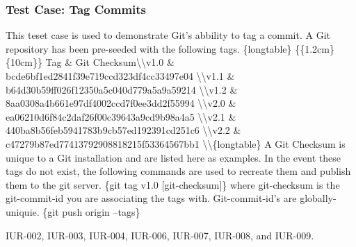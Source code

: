 \subsubsection{Test Case: Tag Commits}
\begin{description}[align=right,leftmargin=3.2cm,labelindent=3.0cm]
\item[Purpose:] This teset case is used to demonstrate Git's abbility to tag a commit.  A Git repository has been pre-seeded with the following tags. \textbackslashbegin\{longtable\} \{\textbarC\{1.2cm\}\textbarL\{10cm\}\textbar\} \textbackslashhline Tag \& Git Checksum\textbackslash\textbackslash \textbackslashhline v1.0 \& bcde6bf1ed2841f39e719ccd323df4cc33497e04 \textbackslash\textbackslash \textbackslashhline v1.1 \& b64d30b59ff026f12350a5c040d779a5a9a59214 \textbackslash\textbackslash \textbackslashhline v1.2 \& 8aa0308a4b661e97df4002ccd7f0ee3dd2f55994 \textbackslash\textbackslash \textbackslashhline v2.0 \& ea06210d6f84c2daf26f00c39643a9cd9b98a4a5 \textbackslash\textbackslash \textbackslashhline v2.1 \& 440ba8b56feb5941783b9cb57ed192391cd251c6 \textbackslash\textbackslash \textbackslashhline v2.2 \& c47279b87ed77413792908818215f53364567bb1 \textbackslash\textbackslash \textbackslashhline \textbackslashend\{longtable\}  A Git Checksum is unique to a Git installation and are listed here as examples.  In the event these tags do not exist, the following commands are used to recreate them and publish them to the git server.      \textbackslashtextbf\{git tag v1.0 [git-checksum]\}  where git-checksum is the git-commit-id you are associating the tags with.  Git-commit-id's are globally-uniquie.      \textbackslashtextbf\{git push origin --tags\}
\item[Requirement:] IUR-002, IUR-003, IUR-004, IUR-006, IUR-007, IUR-008, and IUR-009.
\end{description}

